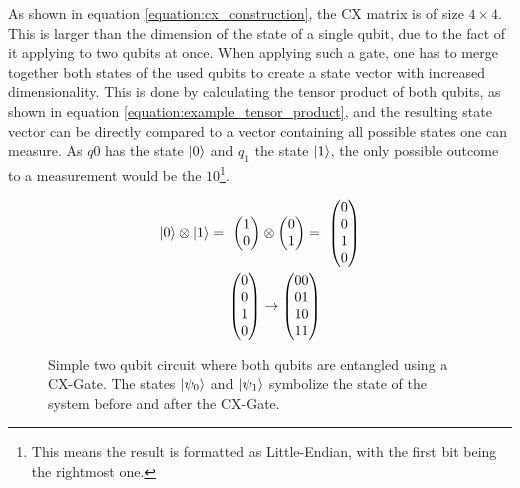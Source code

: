 As shown in equation \ref{equation:cx_construction}, the CX matrix is of size $4\times4$. This is larger than the dimension of the state of a single qubit, due to the fact of it applying to two qubits at once. When applying such a gate, one has to merge together both states of the used qubits to create a state vector with increased dimensionality. This is done by calculating the tensor product of both qubits, as shown in equation \ref{equation:example_tensor_product}, and the resulting state vector can be directly compared to a vector containing all possible states one can measure. As $q0$ has the state $\ket{0}$ and $q_1$ the state $\ket{1}$, the only possible outcome to a measurement would be the $10$\footnote{This means the result is formatted as Little-Endian, with the first bit being the rightmost one.}.

\begin{equation}
    \centering
    \begin{split}
        \ket{0} \otimes \ket{1} =\ \begin{pmatrix}1 \\ 0\end{pmatrix} &\otimes \begin{pmatrix}0 \\ 1\end{pmatrix} =\ \begin{pmatrix} 0 \\ 0 \\ 1 \\ 0 \end{pmatrix} \\
        \begin{pmatrix} 0 \\ 0 \\ 1 \\ 0 \end{pmatrix} &\rightarrow \begin{pmatrix}00 \\ 01 \\ 10 \\ 11\end{pmatrix}
    \end{split}
    \label{equation:example_tensor_product}
\end{equation}

\begin{figure}[!h]
    \centering
    \caption{Simple two qubit circuit where both qubits are entangled using a CX-Gate. The states $\ket{\psi_0}$ and $\ket{\psi_1}$ symbolize the state of the system before and after the CX-Gate.}
    \label{circuit:example_cx_circuit}
\end{figure}

